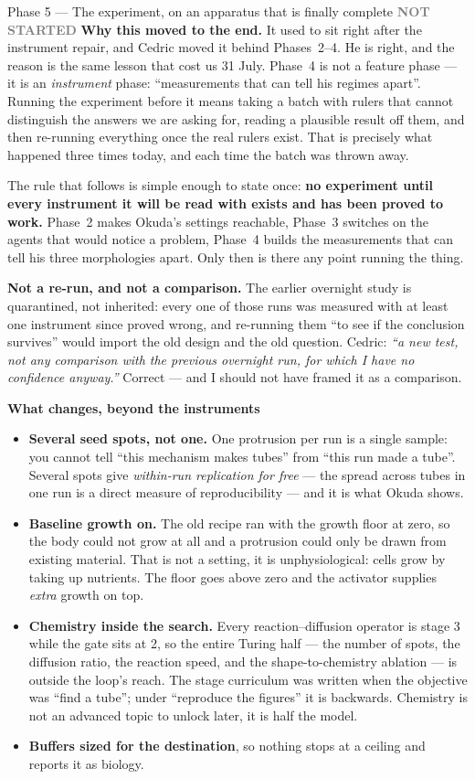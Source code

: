 \documentclass[11pt,a4paper]{article}
\newcommand{\todo}{\textcolor{grey}{\textbf{NOT STARTED}}}
\begin{document}
\begin{phasebox}{Phase 5 --- The experiment, on an apparatus that is finally complete \hfill \todo}
\textbf{Why this moved to the end.} It used to sit right after the instrument repair, and Cedric
moved it behind Phases~2--4. He is right, and the reason is the same lesson that cost us 31 July.
Phase~4 is not a feature phase --- it is an \emph{instrument} phase: ``measurements that can tell
his regimes apart''. Running the experiment before it means taking a batch with rulers that cannot
distinguish the answers we are asking for, reading a plausible result off them, and then re-running
everything once the real rulers exist. That is precisely what happened three times today, and each
time the batch was thrown away.

The rule that follows is simple enough to state once: \textbf{no experiment until every instrument
it will be read with exists and has been proved to work.} Phase~2 makes Okuda's settings reachable,
Phase~3 switches on the agents that would notice a problem, Phase~4 builds the measurements that
can tell his three morphologies apart. Only then is there any point running the thing.

\textbf{Not a re-run, and not a comparison.} The earlier overnight study is quarantined, not
inherited: every one of those runs was measured with at least one instrument since proved wrong,
and re-running them ``to see if the conclusion survives'' would import the old design and the old
question. Cedric: \emph{``a new test, not any comparison with the previous overnight run, for which
I have no confidence anyway.''} Correct --- and I should not have framed it as a comparison.

\textbf{What changes, beyond the instruments}
\begin{itemize}
\item \textbf{Several seed spots, not one.} One protrusion per run is a single sample: you cannot
tell ``this mechanism makes tubes'' from ``this run made a tube''. Several spots give
\emph{within-run replication for free} --- the spread across tubes in one run is a direct measure
of reproducibility --- and it is what Okuda shows.
\item \textbf{Baseline growth on.} The old recipe ran with the growth floor at zero, so the body
could not grow at all and a protrusion could only be drawn from existing material. That is not a
setting, it is unphysiological: cells grow by taking up nutrients. The floor goes above zero and
the activator supplies \emph{extra} growth on top.
\item \textbf{Chemistry inside the search.} Every reaction--diffusion operator is stage 3 while the
gate sits at 2, so the entire Turing half --- the number of spots, the diffusion ratio, the reaction
speed, and the shape-to-chemistry ablation --- is outside the loop's reach. The stage curriculum
was written when the objective was ``find a tube''; under ``reproduce the figures'' it is backwards.
Chemistry is not an advanced topic to unlock later, it is half the model.
\item \textbf{Buffers sized for the destination}, so nothing stops at a ceiling and reports it as
biology.
\end{itemize}


\end{phasebox}
\end{document}
